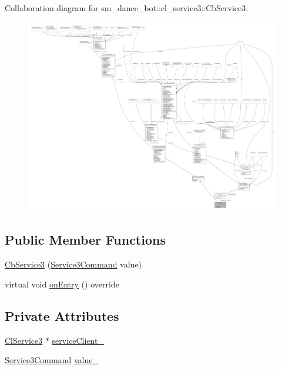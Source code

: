 Collaboration diagram for sm\+\_\+dance\+\_\+bot\+:\+:cl\+\_\+service3\+:\+:Cb\+Service3\+:
\nopagebreak
\begin{figure}[H]
\begin{center}
\leavevmode
\includegraphics[width=350pt]{classsm__dance__bot_1_1cl__service3_1_1CbService3__coll__graph}
\end{center}
\end{figure}
\subsection*{Public Member Functions}
\begin{DoxyCompactItemize}
\item 
\hyperlink{classsm__dance__bot_1_1cl__service3_1_1CbService3_a0f03200cabbf54e63efb0a6db4f48ebf}{Cb\+Service3} (\hyperlink{namespacesm__dance__bot_1_1cl__service3_adbcecb84d61edff09f1fb67ef9607ac4}{Service3\+Command} value)
\item 
virtual void \hyperlink{classsm__dance__bot_1_1cl__service3_1_1CbService3_ae9e3796b507ad96cc0890fec0f64a4b7}{on\+Entry} () override
\end{DoxyCompactItemize}
\subsection*{Private Attributes}
\begin{DoxyCompactItemize}
\item 
\hyperlink{classsm__dance__bot_1_1cl__service3_1_1ClService3}{Cl\+Service3} $\ast$ \hyperlink{classsm__dance__bot_1_1cl__service3_1_1CbService3_aad53b5aa5eb595c5add3701cfe72079c}{service\+Client\+\_\+}
\item 
\hyperlink{namespacesm__dance__bot_1_1cl__service3_adbcecb84d61edff09f1fb67ef9607ac4}{Service3\+Command} \hyperlink{classsm__dance__bot_1_1cl__service3_1_1CbService3_a9df8640d9bc42607256ca76df60a5af0}{value\+\_\+}
\end{DoxyCompactItemize}

